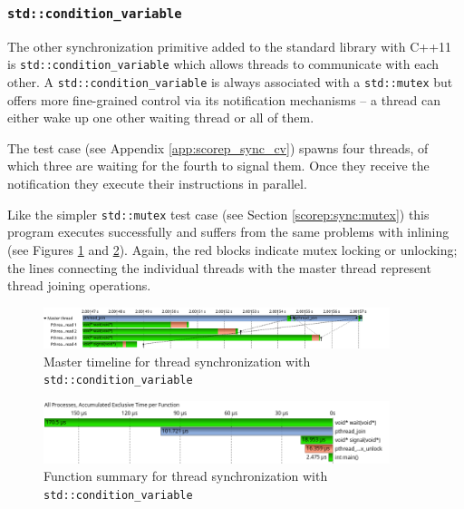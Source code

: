 \subsubsection{\texttt{std::condition\_variable}}\label{scorep:sync:cv}

The other synchronization primitive added to the standard library with C++11 is \texttt{std::condition\_variable} which allows threads to communicate with each other. A \texttt{std::condition\_variable} is always associated with a \texttt{std::mutex} but offers more fine-grained control via its notification mechanisms -- a thread can either wake up one other waiting thread or all of them.

The test case (see Appendix \ref{app:scorep_sync_cv}) spawns four threads, of which three are waiting for the fourth to signal them. Once they receive the notification they execute their instructions in parallel.

Like the simpler \texttt{std::mutex} test case (see Section \ref{scorep:sync:mutex}) this program executes successfully and suffers from the same problems with inlining (see Figures \ref{scorep:sync_pthread_cv_timeline} and \ref{scorep:sync_pthread_cv_summary}). Again, the red blocks indicate mutex locking or unlocking; the lines connecting the individual threads with the master thread represent thread joining operations.

\begin{figure}[htbp]
	\begin{center}
		\includegraphics[width=0.9\textwidth]{img/scorep_pthread_cv_timeline.png}
		\caption{Master timeline for thread synchronization with \texttt{std::condition\_variable}}
		\label{scorep:sync_pthread_cv_timeline}
	\end{center}
\end{figure}

\begin{figure}[htbp]
	\begin{center}
		\includegraphics[width=0.9\textwidth]{img/scorep_pthread_cv_summary.png}
		\caption{Function summary for thread synchronization with \texttt{std::condition\_variable}}
		\label{scorep:sync_pthread_cv_summary}
	\end{center}
\end{figure}

